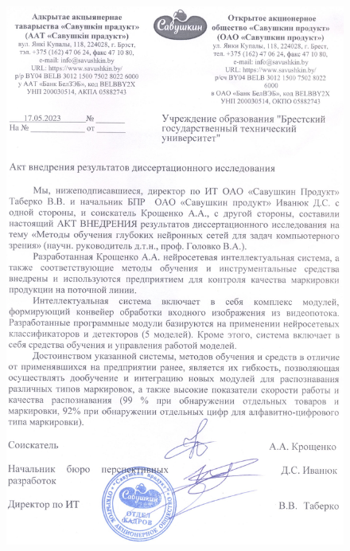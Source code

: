 \begin{figure}[ht]
	\centering
	\includegraphics[height=20cm]{man-source/images/appendix/appendixActs/actSavushkin.jpg}
\end{figure}

